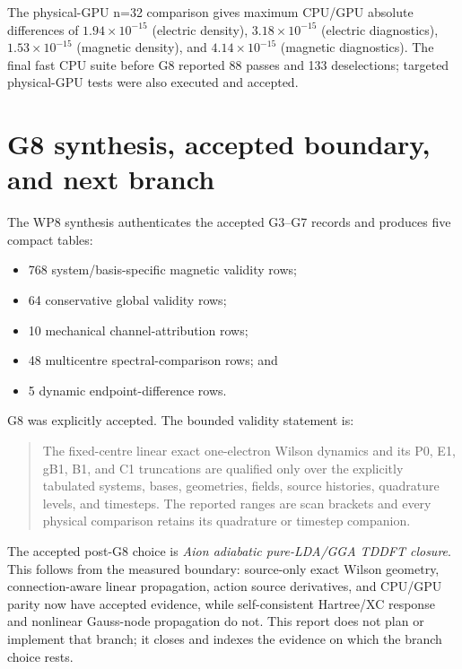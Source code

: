 \documentclass[11pt]{article}
\begin{document}
The physical-GPU n=32 comparison gives maximum CPU/GPU absolute differences
of $1.94\times10^{-15}$ (electric density), $3.18\times10^{-15}$ (electric
diagnostics), $1.53\times10^{-15}$ (magnetic density), and
$4.14\times10^{-15}$ (magnetic diagnostics).  The final fast CPU suite before
G8 reported 88 passes and 133 deselections; targeted physical-GPU tests were
also executed and accepted.

\section{G8 synthesis, accepted boundary, and next branch}

The WP8 synthesis authenticates the accepted G3--G7 records and produces five
compact tables:

\begin{itemize}
  \item 768 system/basis-specific magnetic validity rows;
  \item 64 conservative global validity rows;
  \item 10 mechanical channel-attribution rows;
  \item 48 multicentre spectral-comparison rows; and
  \item 5 dynamic endpoint-difference rows.
\end{itemize}

G8 was explicitly accepted.  The bounded validity statement is:

\begin{quote}
The fixed-centre linear exact one-electron Wilson dynamics and its P0, E1,
gB1, B1, and C1 truncations are qualified only over the explicitly tabulated
systems, bases, geometries, fields, source histories, quadrature levels, and
timesteps.  The reported ranges are scan brackets and every physical
comparison retains its quadrature or timestep companion.
\end{quote}

The accepted post-G8 choice is \emph{Aion adiabatic pure-LDA/GGA TDDFT
closure}.  This follows from the measured boundary: source-only exact Wilson
geometry, connection-aware linear propagation, action source derivatives,
and CPU/GPU parity now have accepted evidence, while self-consistent
Hartree/XC response and nonlinear Gauss-node propagation do not.  This report
does not plan or implement that branch; it closes and indexes the evidence on
which the branch choice rests.

\clearpage
\appendix
\end{document}
